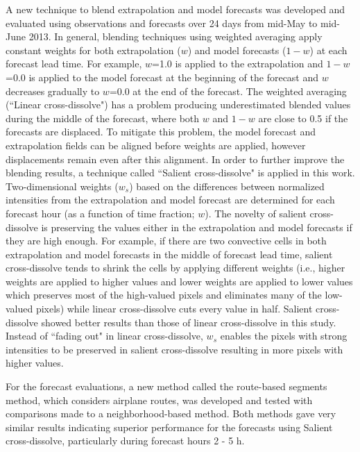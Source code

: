 \documentclass[12pt]{article}
\begin{document}
A new technique to blend extrapolation and model forecasts was developed and evaluated using observations and forecasts over 24 days from mid-May to mid-June 2013. In general, blending techniques using weighted averaging apply constant weights for both extrapolation ($w$) and model forecasts ($1-w$) at each forecast lead time. For example, $w$=1.0 is applied to the extrapolation and $1-w$=0.0 is applied to the model forecast at the beginning of the forecast and $w$ decreases gradually to $w$=0.0 at the end of the forecast. The weighted averaging (``Linear cross-dissolve") has a problem producing underestimated blended values during the middle of the forecast, where both $w$ and $1-w$ are close to 0.5 if the forecasts are displaced. To mitigate this problem, the model forecast and extrapolation fields can be aligned before weights are applied, however displacements remain even after this alignment. In order to further improve the blending results, a technique called ``Salient cross-dissolve" is applied in this work. Two-dimensional weights ($w_{s}$) based on the differences between normalized intensities from the extrapolation and model forecast are determined for each forecast hour (as a function of time fraction; $w$). The novelty of salient cross-dissolve is preserving the values either in the extrapolation and model forecasts if they are high enough. For example, if there are two convective cells in both extrapolation and model forecasts in the middle of forecast lead time, salient cross-dissolve tends to shrink the cells by applying different weights (i.e., higher weights are applied to higher values and lower weights are applied to lower values which preserves most of the high-valued pixels and eliminates many of the low-valued pixels) while linear cross-dissolve cuts every value in half. Salient cross-dissolve showed better results than those of linear cross-dissolve in this study. Instead of ``fading out" in linear cross-dissolve, $w_{s}$ enables the pixels with strong intensities to be preserved in salient cross-dissolve resulting in more pixels with higher values. 

For the forecast evaluations, a new method called the route-based segments method, which considers airplane routes, was developed and tested with comparisons made to a neighborhood-based method. Both methods gave very similar results indicating superior performance for the forecasts using Salient cross-dissolve, particularly during forecast hours 2 - 5 h.

\end{document}
